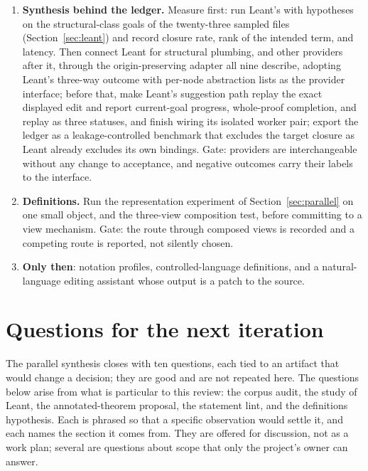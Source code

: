 \documentclass[11pt,a4paper]{article}
\newcommand{\code}[1]{\texttt{\detokenize{#1}}}
\theoremstyle{definition}
\begin{document}
\begin{enumerate}
\item \textbf{Synthesis behind the ledger.} Measure first: run Leant's \code{:synth} with hypotheses on the structural-class goals of the twenty-three sampled files (Section~\ref{sec:leant}) and record closure rate, rank of the intended term, and latency. Then connect Leant for structural plumbing, and other providers after it, through the origin-preserving adapter all nine describe, adopting Leant's three-way outcome with per-node abstraction lists as the provider interface; before that, make Leant's suggestion path replay the exact displayed edit and report current-goal progress, whole-proof completion, and replay as three statuses, and finish wiring its isolated worker pair; export the ledger as a leakage-controlled benchmark that excludes the target closure as Leant already excludes its own \code{it} bindings. Gate: providers are interchangeable without any change to acceptance, and negative outcomes carry their labels to the interface.
\item \textbf{Definitions.} Run the representation experiment of Section~\ref{sec:parallel} on one small object, and the three-view composition test, before committing to a view mechanism. Gate: the route through composed views is recorded and a competing route is reported, not silently chosen.
\item \textbf{Only then}: notation profiles, controlled-language definitions, and a natural-language editing assistant whose output is a patch to the source.
\end{enumerate}

\section{Questions for the next iteration}
\label{sec:questions}
The parallel synthesis closes with ten questions, each tied to an artifact that would change a decision; they are good and are not repeated here. The questions below arise from what is particular to this review: the corpus audit, the study of Leant, the annotated-theorem proposal, the statement lint, and the definitions hypothesis. Each is phrased so that a specific observation would settle it, and each names the section it comes from. They are offered for discussion, not as a work plan; several are questions about scope that only the project's owner can answer.
\end{document}
